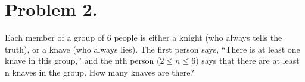 \section{Problem 2.}

Each member of a group of $6$ people is either a knight (who always tells the truth), or a knave (who always lies).  
The first person says, “There is at least one knave in this group,” and the nth person ($2 \leq n \leq 6$) says that there are at least n knaves in the group. 
How many knaves are there?

\begin{solution}

\end{solution}
